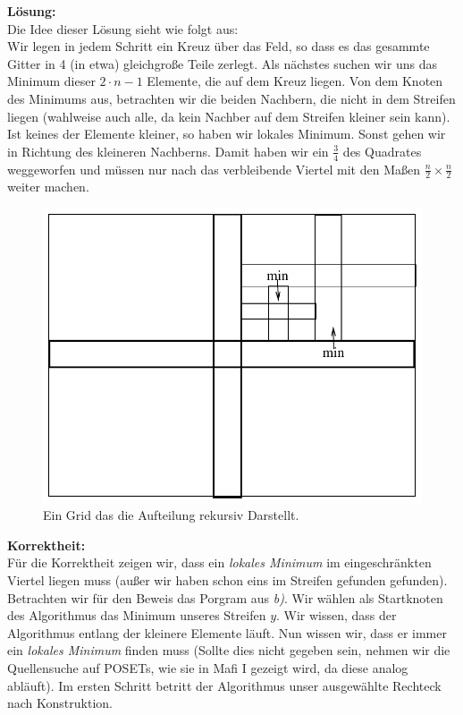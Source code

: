 \documentclass[11pt,a4paper,ngerman]{article}
\begin{document}
\begin{enumerate}[\bfseries (a)]
\textbf{Lösung:}\\
Die Idee dieser Lösung sieht wie folgt aus:\\
Wir legen in jedem Schritt ein Kreuz über das Feld, so dass es das gesammte Gitter in 4 (in etwa) gleichgroße Teile zerlegt. Als nächstes suchen wir uns das Minimum dieser $2 \cdot n - 1$ Elemente, die auf dem Kreuz liegen. Von dem Knoten des Minimums aus, betrachten wir die beiden Nachbern, die nicht in dem Streifen liegen (wahlweise auch alle, da kein Nachber auf dem Streifen kleiner sein kann). Ist keines der Elemente kleiner, so haben wir lokales Minimum. Sonst gehen wir in Richtung des kleineren Nachberns.
Damit haben wir ein $\frac{3}{4}$ des Quadrates weggeworfen und müssen nur nach das verbleibende Viertel mit den Maßen $\frac{n}{2} \times \frac{n}{2}$ weiter machen.

\begin{figure}[h!]
\centering
\includegraphics[scale=0.7]{local_min.pdf}\\
Ein Grid das die Aufteilung rekursiv Darstellt.
\end{figure}

\pagebreak

\textbf{Korrektheit:}\\
Für die Korrektheit zeigen wir, dass ein \emph{lokales Minimum} im eingeschränkten Viertel liegen muss (außer wir haben schon eins im Streifen gefunden gefunden).\\

Betrachten wir für den Beweis das Porgram aus \emph{b)}. Wir wählen als Startknoten des Algorithmus das Minimum unseres Streifen $y$. Wir wissen, dass der Algorithmus entlang der kleinere Elemente läuft. Nun wissen wir, dass er immer ein \emph{lokales Minimum} finden muss (Sollte dies nicht gegeben sein, nehmen wir die Quellensuche auf POSETs, wie sie in Mafi I gezeigt wird, da diese analog abläuft).
Im ersten Schritt betritt der Algorithmus unser ausgewählte Rechteck nach Konstruktion.\\


\end{enumerate}
\end{document}
